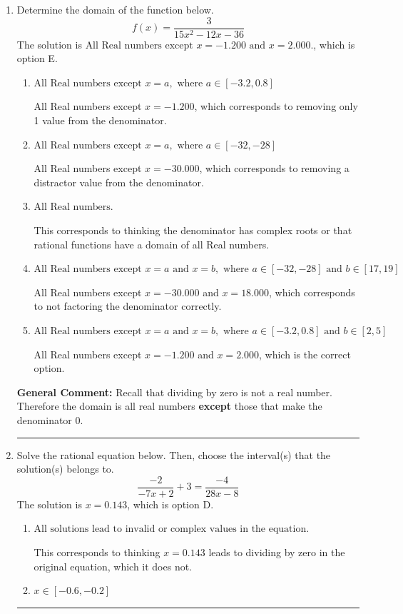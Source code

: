 \documentclass{extbook}[14pt]
\newcommand{\litem}[1]{\item #1

\rule{\textwidth}{0.4pt}}
\begin{document}
\begin{enumerate}\litem{
Determine the domain of the function below.
\[ f(x) = \frac{3}{15x^{2} -12 x -36} \]The solution is \( \text{All Real numbers except } x = -1.200 \text{ and } x = 2.000. \), which is option E.\begin{enumerate}[label=\Alph*.]
\item \( \text{All Real numbers except } x = a, \text{ where } a \in [-3.2, 0.8] \)

All Real numbers except $x = -1.200$, which corresponds to removing only 1 value from the denominator.
\item \( \text{All Real numbers except } x = a, \text{ where } a \in [-32, -28] \)

All Real numbers except $x = -30.000$, which corresponds to removing a distractor value from the denominator.
\item \( \text{All Real numbers.} \)

This corresponds to thinking the denominator has complex roots or that rational functions have a domain of all Real numbers.
\item \( \text{All Real numbers except } x = a \text{ and } x = b, \text{ where } a \in [-32, -28] \text{ and } b \in [17, 19] \)

All Real numbers except $x = -30.000$ and $x = 18.000$, which corresponds to not factoring the denominator correctly.
\item \( \text{All Real numbers except } x = a \text{ and } x = b, \text{ where } a \in [-3.2, 0.8] \text{ and } b \in [2, 5] \)

All Real numbers except $x = -1.200$ and $x = 2.000$, which is the correct option.
\end{enumerate}

\textbf{General Comment:} Recall that dividing by zero is not a real number. Therefore the domain is all real numbers \textbf{except} those that make the denominator 0.
}
\litem{
Solve the rational equation below. Then, choose the interval(s) that the solution(s) belongs to.
\[ \frac{-2}{-7x + 2} + 3 = \frac{-4}{28x -8} \]The solution is \( x = 0.143 \), which is option D.\begin{enumerate}[label=\Alph*.]
\item \( \text{All solutions lead to invalid or complex values in the equation.} \)

This corresponds to thinking $x = 0.143$ leads to dividing by zero in the original equation, which it does not.
\item \( x \in [-0.6,-0.2] \)


\end{enumerate}}
\end{enumerate}
\end{document}
